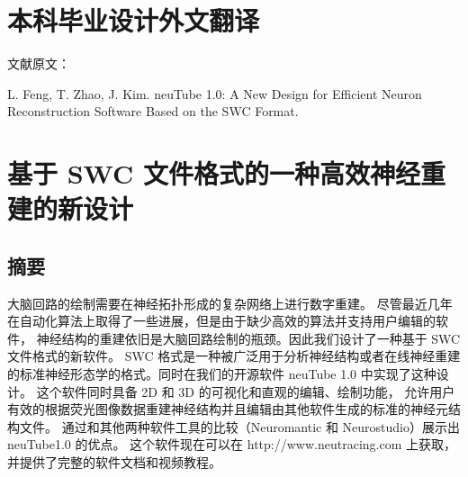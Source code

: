 {
\renewcommand{\baselinestretch}{1.25}\selectfont

{
  \titleformat{\chapter}[block]{\erhao\songti\bfseries\filcenter}{}{0em}{}{}
  \chapter{本科毕业设计外文翻译}
}

{
  \setlength{\parindent}{0em}

  文献原文：

  L. Feng, T. Zhao, J. Kim. neuTube 1.0: A New Design for Efficient Neuron Reconstruction Software Based on the SWC Format. \par
}

\vspace{2em}

{
  \renewcommand{\cleardoublepage}{}
  \renewcommand{\clearpage}{}
  \titleformat{\chapter}[block]{\sanhao\songti\bfseries\filcenter}{}{0em}{}{}
  \chapter*{基于 SWC 文件格式的一种高效神经重建的新设计}
}

\section*{摘要}

大脑回路的绘制需要在神经拓扑形成的复杂网络上进行数字重建。 尽管最近几年在自动化算法上取得了一些进展，但是由于缺少高效的算法并支持用户编辑的软件， 神经结构的重建依旧是大脑回路绘制的瓶颈。因此我们设计了一种基于 SWC 文件格式的新软件。 SWC 格式是一种被广泛用于分析神经结构或者在线神经重建的标准神经形态学的格式。同时在我们的开源软件 neuTube 1.0 中实现了这种设计。 这个软件同时具备 2D 和 3D 的可视化和直观的编辑、绘制功能， 允许用户有效的根据荧光图像数据重建神经结构并且编辑由其他软件生成的标准的神经元结构文件。 通过和其他两种软件工具的比较（Neuromantic 和 Neurostudio）展示出 neuTube1.0 的优点。 这个软件现在可以在 http://www.neutracing.com 上获取， 并提供了完整的软件文档和视频教程。

}
